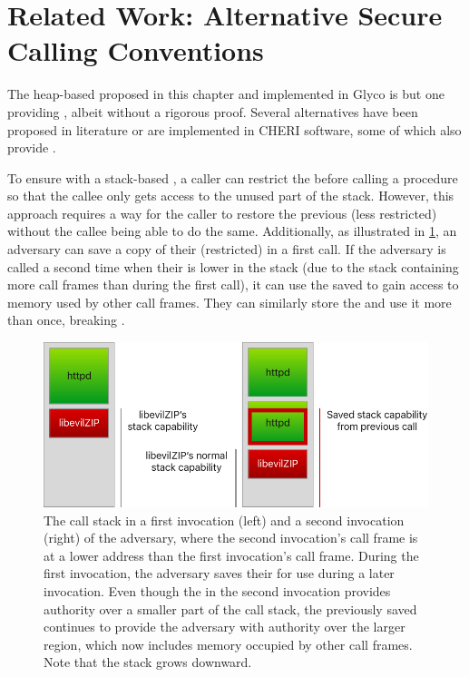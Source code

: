 \documentclass[main.tex]{subfiles}
\begin{document}

\section{Related Work: Alternative Secure Calling Conventions} \label{sct:alt-scc}
The heap-based  proposed in this chapter and implemented in Glyco is but one  providing , albeit without a rigorous proof. Several alternatives have been proposed in literature or are implemented in CHERI software, some of which also provide .

To ensure  with a stack-based , a caller can restrict the  before calling a procedure so that the callee only gets access to the unused part of the stack. However, this approach requires a way for the caller to restore the previous (less restricted)  without the callee being able to do the same. Additionally, as illustrated in \cref{fig:savedstackcap}, an adversary can save a copy of their (restricted)  in a first call. If the adversary is called a second time when their  is lower in the stack (due to the stack containing more call frames than during the first call), it can use the saved  to gain access to memory used by other call frames. They can similarly store the  and use it more than once, breaking .

\begin{figure}
	\centering
	\includegraphics{Images/Saved Stack Cap.pdf}
	\caption{The call stack in a first invocation (left) and a second invocation (right) of the adversary, where the second invocation's call frame is at a lower address than the first invocation's call frame. During the first invocation, the adversary saves their  for use during a later invocation. Even though the  in the second invocation provides authority over a smaller part of the call stack, the previously saved  continues to provide the adversary with authority over the larger region, which now includes memory occupied by other call frames. Note that the stack grows downward.}
	\label{fig:savedstackcap}
\end{figure}
\end{document}
